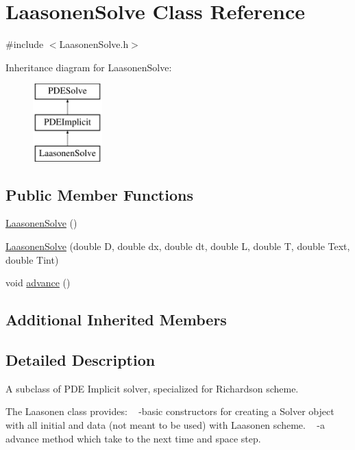 \hypertarget{class_laasonen_solve}{}\section{Laasonen\+Solve Class Reference}
\label{class_laasonen_solve}


{\ttfamily \#include $<$Laasonen\+Solve.\+h$>$}

Inheritance diagram for Laasonen\+Solve\+:\begin{figure}[H]
\begin{center}
\leavevmode
\includegraphics[height=3.000000cm]{class_laasonen_solve}
\end{center}
\end{figure}
\subsection*{Public Member Functions}
\begin{DoxyCompactItemize}
\item 
\hyperlink{class_laasonen_solve_ab71dba8e7f61306851762f35cce40e53}{Laasonen\+Solve} ()
\item 
\hyperlink{class_laasonen_solve_afee5334bc58eaf72c312d73ff3e8829c}{Laasonen\+Solve} (double D, double dx, double dt, double L, double T, double Text, double Tint)
\item 
void \hyperlink{class_laasonen_solve_af320ccb100c388621052d2a2cb57858a}{advance} ()
\end{DoxyCompactItemize}
\subsection*{Additional Inherited Members}


\subsection{Detailed Description}
A subclass of P\+DE Implicit solver, specialized for Richardson scheme.

The Laasonen class provides\+: ~\newline
-\/basic constructors for creating a Solver object with all initial  and data (not meant to be used)  with Laasonen scheme. ~\newline
-\/a advance method which take to the next time and space step. 


